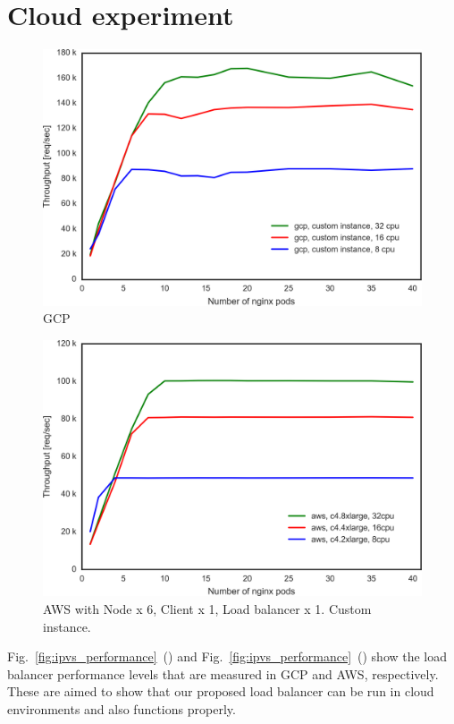 \section{Cloud experiment}

\begin{figure}[t]
  \centering
  \includegraphics[width=0.8\columnwidth]{Figs/gcp_all_tp}
  \caption{GCP}
  \label{fig:gcp_all_ieice}
\end{figure}

\begin{figure}[t]
  \centering
  \includegraphics[width=0.8\columnwidth]{Figs/aws_c4_tp}
  \caption{AWS with Node x 6, Client x 1, Load balancer x 1. Custom instance. }
  \label{fig:aws_c4_ieice}
\end{figure}

Fig.~\ref{fig:ipvs_performance}~() and Fig.~\ref{fig:ipvs_performance}~() show the load balancer performance levels that are measured in GCP and AWS, respectively.
These are aimed to show that our proposed load balancer can be run in cloud environments and also functions properly.

